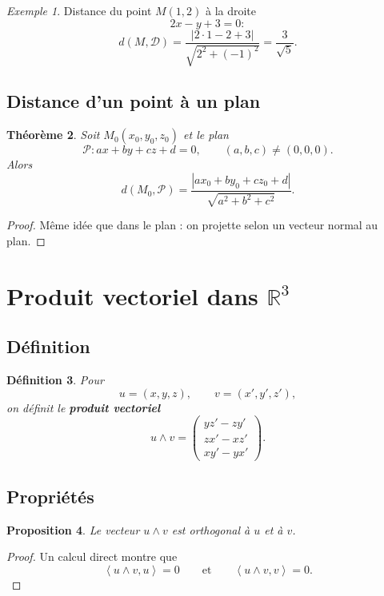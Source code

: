 \documentclass[11pt,a4paper]{article}
\newtheorem{definition}{Définition}[section]
\newtheorem{theoreme}[definition]{Théorème}
\newtheorem{proposition}[definition]{Proposition}
\theoremstyle{remark}
\newtheorem{exemple}[definition]{Exemple}
\newcommand{\R}{\mathbb{R}}
\newcommand{\scal}[2]{\left\langle #1,#2\right\rangle}
\newcommand{\abs}[1]{\left|#1\right|}
\begin{document}
\begin{exemple}
Distance du point \(M(1,2)\) à la droite
\[
2x-y+3=0 :
\]
\[
d(M,\mathcal D)=\frac{\abs{2\cdot 1-2+3}}{\sqrt{2^2+(-1)^2}}
=\frac{3}{\sqrt5}.
\]
\end{exemple}

\subsection{Distance d’un point à un plan}

\begin{theoreme}
Soit \(M_0(x_0,y_0,z_0)\) et le plan
\[
\mathcal P: ax+by+cz+d=0,
\qquad (a,b,c)\neq (0,0,0).
\]
Alors
\[
d(M_0,\mathcal P)=\frac{\abs{ax_0+by_0+cz_0+d}}{\sqrt{a^2+b^2+c^2}}.
\]
\end{theoreme}

\begin{proof}
Même idée que dans le plan : on projette selon un vecteur normal au plan.
\end{proof}

\section{Produit vectoriel dans \(\R^3\)}

\subsection{Définition}

\begin{definition}
Pour
\[
u=(x,y,z),\qquad v=(x',y',z'),
\]
on définit le \textbf{produit vectoriel}
\[
u\wedge v=
\begin{pmatrix}
yz'-zy'\\
zx'-xz'\\
xy'-yx'
\end{pmatrix}.
\]
\end{definition}

\subsection{Propriétés}

\begin{proposition}
Le vecteur \(u\wedge v\) est orthogonal à \(u\) et à \(v\).
\end{proposition}

\begin{proof}
Un calcul direct montre que
\[
\scal{u\wedge v}{u}=0
\qquad \text{et} \qquad
\scal{u\wedge v}{v}=0.
\]
\end{proof}
\end{document}
